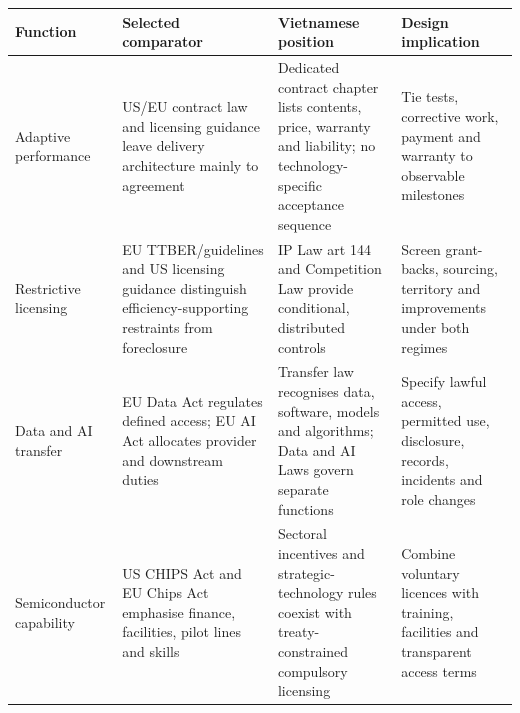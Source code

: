 \documentclass[
]{article}
\newcounter{none} %
\begin{document}
{\def\LTcaptype{none} %
\begin{longtable}[]{@{}
  >{\raggedright\arraybackslash}p{}
  >{\raggedright\arraybackslash}p{}
  >{\raggedright\arraybackslash}p{}
  >{\raggedright\arraybackslash}p{}@{}}
\toprule\noalign{}
\begin{minipage}[b]{\linewidth}\centering
\textbf{Function}
\end{minipage} & \begin{minipage}[b]{\linewidth}\centering
\textbf{Selected comparator}
\end{minipage} & \begin{minipage}[b]{\linewidth}\centering
\textbf{Vietnamese position}
\end{minipage} & \begin{minipage}[b]{\linewidth}\centering
\textbf{Design implication}
\end{minipage} \\
\midrule\noalign{}
\endhead
\bottomrule\noalign{}
\endlastfoot
Adaptive performance & US/EU contract law and licensing guidance leave
delivery architecture mainly to agreement & Dedicated contract chapter
lists contents, price, warranty and liability; no technology-specific
acceptance sequence & Tie tests, corrective work, payment and warranty
to observable milestones \\
Restrictive licensing & EU TTBER/guidelines and US licensing guidance
distinguish efficiency-supporting restraints from foreclosure & IP Law
art 144 and Competition Law provide conditional, distributed controls &
Screen grant-backs, sourcing, territory and improvements under both
regimes \\
Data and AI transfer & EU Data Act regulates defined access; EU AI Act
allocates provider and downstream duties & Transfer law recognises data,
software, models and algorithms; Data and AI Laws govern separate
functions & Specify lawful access, permitted use, disclosure, records,
incidents and role changes \\
Semiconductor capability & US CHIPS Act and EU Chips Act emphasise
finance, facilities, pilot lines and skills & Sectoral incentives and
strategic-technology rules coexist with treaty-constrained compulsory
licensing & Combine voluntary licences with training, facilities and
transparent access terms \\
\end{longtable}
}
\end{document}
